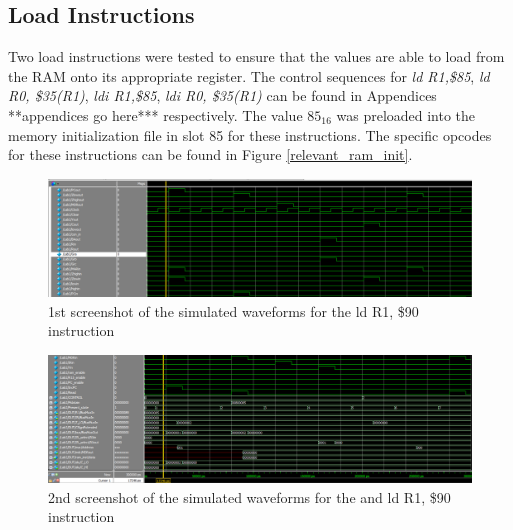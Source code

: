 \documentclass{article}
\begin{document}
    \subsection{Load Instructions}
        Two load instructions were tested to ensure that the values are able to load from the RAM onto its appropriate register. The control sequences for \emph{ld R1,\$85}, \emph{ld R0, \$35(R1)}, \emph{ldi R1,\$85}, \emph{ldi R0, \$35(R1)} can be found in  Appendices **appendices go here*** respectively. The value $85_{16}$ was preloaded into the memory initialization file in slot 85 for these instructions. The specific opcodes for these instructions can be found in Figure \ref{relevant_ram_init}. 
       
        \begin{figure}[h!]

            \begin{center}
                \includegraphics[width=15cm]{ld_case_1_wave_top_half.png}
                \caption{1st screenshot of the simulated waveforms for the  ld  R1, \$90 instruction}
            \end{center}
        \end{figure}

        \begin{figure}[h!]
            \begin{center}
                \includegraphics[width=15cm]{ld_case_1_wave_bottom_half.png}
                \caption{2nd screenshot of the simulated waveforms for the and ld  R1, \$90 instruction}
            \end{center}
        \end{figure}
\end{document}
